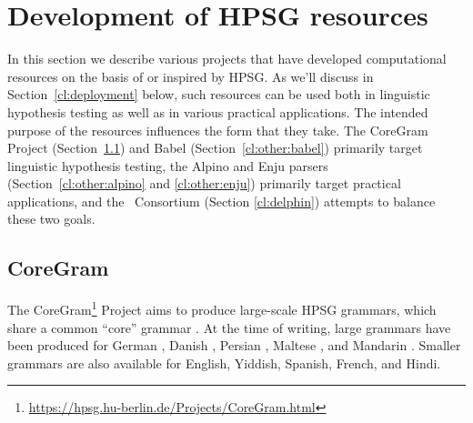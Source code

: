 \documentclass[output=paper,nonflat]{langsci/langscibook}
\begin{document}






\section{Development of HPSG resources}
\label{cl:resources}

In this section we describe various projects that have developed computational resources on the basis of or inspired by HPSG.
As we'll discuss in Section~\ref{cl:deployment} below,
such resources can be used both in linguistic hypothesis testing as well as in various practical applications.
The intended purpose of the resources influences the form that they take.
The CoreGram Project (Section~\ref{cl:coregram}) and Babel (Section~\ref{cl:other:babel}) primarily target linguistic hypothesis testing,
the Alpino and Enju parsers (Section~\ref{cl:other:alpino} and \ref{cl:other:enju}) primarily target practical applications,
and the \delphin\ Consortium (Section \ref{cl:delphin}) attempts to balance these two goals.


\subsection{CoreGram}
\label{cl:coregram}

The CoreGram\footnote{
	\url{https://hpsg.hu-berlin.de/Projects/CoreGram.html}
} Project
aims to produce large-scale HPSG grammars,
which share a common ``core'' grammar \citep{MuellerCoreGram}.
At the time of writing, large grammars have been produced for
German \citep{MuellerLehrbuch1},
Danish \citep{MOeDanish-language},
Persian \citep{MG2010a},
Maltese \citep{MuellerMalteseSketch},
and Mandarin \citep{ML2013a}.
Smaller grammars are also available for English, Yiddish, Spanish, French, and Hindi.
\end{document}

